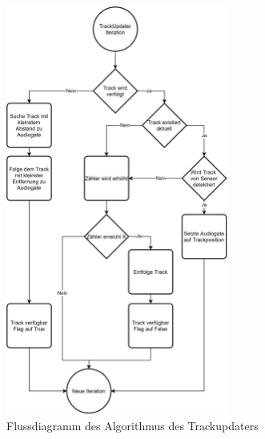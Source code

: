 \begin{figure}[h]
    \centering
    \includegraphics[width=0.65\textwidth]{content/assets/TrackUpdaterSTT.png}
    \caption{Flussdiagramm des Algorithmus des Trackupdaters}
\end{figure}

